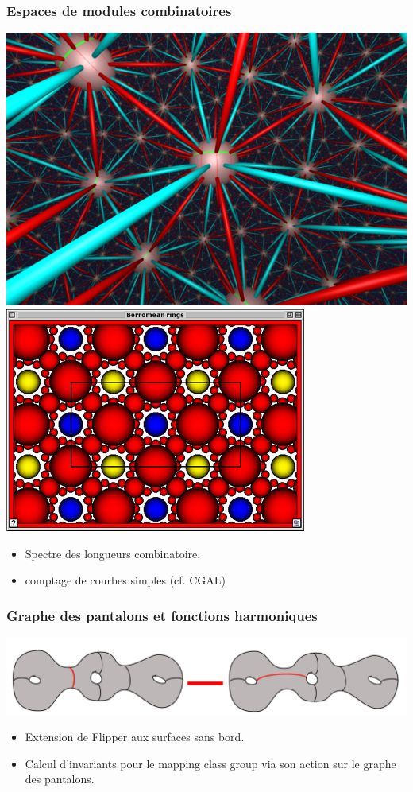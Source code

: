 \documentclass[a4paper,compress]{beamer}  %
\theoremstyle{definition}
\begin{document}
\begin{frame}
  \frametitle{Espaces de modules combinatoires}
\centerline{
\includegraphics[height=.35\textheight]{snappy1.png}\hfill
\includegraphics[height=.35\textheight]{SnapPea-horocusp_view.png}
}
\vspace{1.5cm}

\begin{itemize}
\item Spectre des longueurs combinatoire.
\item comptage de courbes simples (cf. CGAL)
\end{itemize}

\end{frame}
\begin{frame}
  \frametitle{Graphe des pantalons et fonctions harmoniques}
  \centerline{\includegraphics[width=\linewidth]{pants-graph.pdf}
  }
  \vspace{1.5cm}
  
  \begin{itemize}
  \item Extension de Flipper aux surfaces sans bord.
    \item Calcul d'invariants pour le mapping class group via son action sur le graphe des pantalons.
  \end{itemize}
\end{frame}
\end{document}
